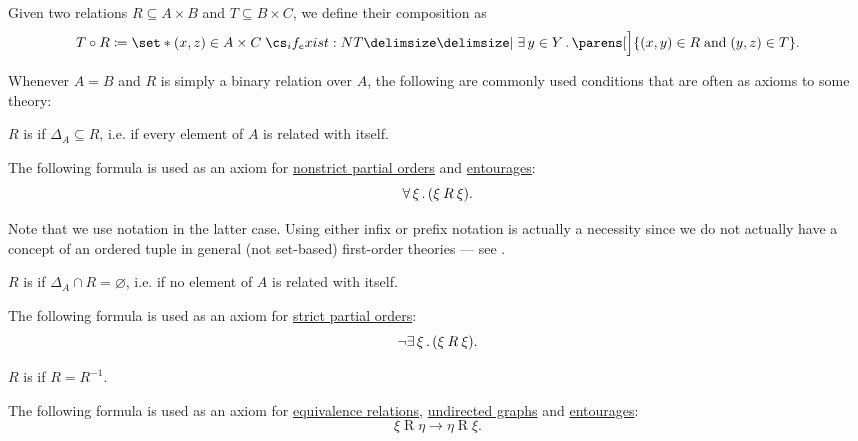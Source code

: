 \begin{definition}
\begin{thmenum}[series=def:binary_relation]
     Given two relations \( R \subseteq A \times B \) and \( T \subseteq B \times C \), we define their composition as
    \begin{equation*}
      T \bincirc R \coloneqq \set*{ (x, z) \in A \times C \given* \qexists {y \in Y} \parens[\Big]{ (x, y) \in R \T{and} (y, z) \in T } }.
    \end{equation*}
  \end{thmenum}

  Whenever \( A = B \) and \( R \) is simply a binary relation over \( A \), the following are commonly used conditions that are often as axioms to some theory:
  \begin{thmenum}[resume=def:binary_relation]
     \( R \) is  if \( \Delta_A \subseteq R \), i.e. if every element of \( A \) is related with itself.

    The following formula is used as an axiom for \hyperref[def:poset/nonstrict]{nonstrict partial orders} and \hyperref[def:entourage]{entourages}:
    \begin{equation}\label{eq:def:binary_relation/reflexive}
      \forall \thinspace \xi \thinspace . \thinspace (\xi \mathbin{R} \xi).
    \end{equation}

    Note that we use  notation in the latter case. Using either infix or prefix notation is actually a necessity since we do not actually have a concept of an ordered tuple in general (not set-based) first-order theories --- see .

     \( R \) is  if \( \Delta_A \cap R = \varnothing \), i.e. if no element of \( A \) is related with itself.

    The following formula is used as an axiom for \hyperref[def:poset/strict]{strict partial orders}:
    \begin{equation}\label{eq:def:binary_relation/irreflexive}
      \neg \exists \thinspace \xi \thinspace . \thinspace (\xi \mathbin{R} \xi).
    \end{equation}

     \( R \) is  if \( R = R^{-1} \).

    The following formula is used as an axiom for \hyperref[def:equivalence_relation]{equivalence relations}, \hyperref[def:undirected_graph]{undirected graphs} and \hyperref[def:entourage]{entourages}:
    \begin{equation}\label{eq:def:binary_relation/symmetric}
      \xi \mathbin{R} \eta \rightarrow \eta \mathbin{R} \xi.
    \end{equation}


\end{thmenum}
\end{definition}
